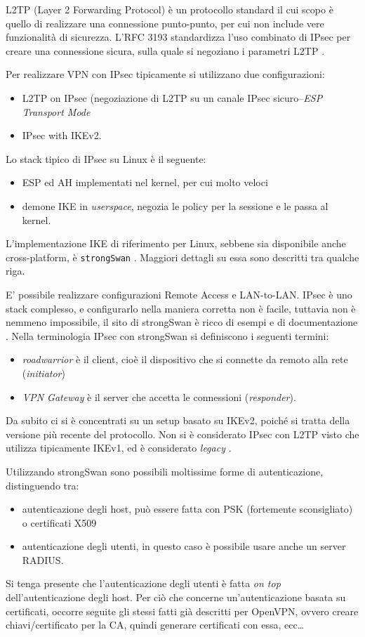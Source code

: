 L2TP (Layer 2 Forwarding Protocol) è un protocollo standard il cui scopo è quello
di realizzare una connessione punto-punto, per cui non include vere funzionalità
di sicurezza. L'RFC 3193 standardizza l'uso combinato di IPsec per creare una
connessione sicura, sulla quale si negoziano
i parametri L2TP \cite{RFC3193}.


Per realizzare VPN con IPsec tipicamente si utilizzano due configurazioni:
\begin{itemize}
  \item L2TP on IPsec (negoziazione di L2TP su un canale IPsec sicuro--\textit{ESP Transport Mode}
  \item IPsec with IKEv2.
\end{itemize}


Lo stack tipico di IPsec su Linux è il seguente:
\begin{itemize}
  \item ESP ed AH implementati nel kernel, per cui molto veloci
  \item demone IKE in \textit{userspace}, negozia le policy per la sessione e le
  passa al kernel.
\end{itemize}
L'implementazione IKE di riferimento per Linux, sebbene sia disponibile anche
cross-platform, è \texttt{strongSwan} \cite{strongswan}. Maggiori dettagli su essa sono descritti
tra qualche riga.


E' possibile realizzare configurazioni Remote Access e LAN-to-LAN. IPsec è uno stack
complesso, e configurarlo nella maniera corretta non è facile, tuttavia non è nemmeno
impossibile, il sito di strongSwan è ricco di esempi e di documentazione \cite{strongswan-example}.
Nella terminologia IPsec con strongSwan si definiscono i seguenti termini:
\begin{itemize}
  \item \textit{roadwarrior} è il client, cioè il dispositivo che si connette da remoto alla rete (\textit{initiator})
  \item \textit{VPN Gateway} è il server che accetta le connessioni (\textit{responder}).
\end{itemize}

Da subito ci si è concentrati su un setup basato su IKEv2, poiché si tratta della
versione più recente del protocollo. Non si è considerato IPsec con L2TP
visto che utilizza tipicamente IKEv1, ed è considerato \textit{legacy} \cite{nordvpn}.

Utilizzando strongSwan sono possibili moltissime forme di autenticazione, distinguendo tra:
\begin{itemize}
  \item autenticazione degli host, può essere fatta con PSK (fortemente sconsigliato) o certificati X509
  \item autenticazione degli utenti, in questo caso è possibile usare anche un
  server RADIUS.
\end{itemize}
Si tenga presente che l'autenticazione degli utenti è fatta \textit{on top} dell'autenticazione
degli host.
Per ciò che concerne un'autenticazione basata su certificati, occorre seguite gli stessi
fatti già descritti per OpenVPN, ovvero creare chiavi/certificato per la CA, quindi generare
certificati con essa, ecc\ldots


